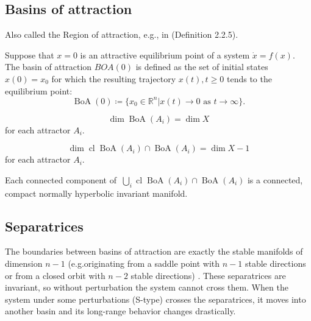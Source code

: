\documentclass{article}
\newcommand{\reals}{\mathbb{R}}
\newcommand{\cl}{\operatorname{cl}}
\newcommand{\boa}{\operatorname{BoA}}
\newcounter{ct}
\begin{document}

\subsection{Basins of attraction}\label{sec:boa}
 \citep{milnor1985attractor}
 \citep{hirsch1995computing}

Also called the Region of attraction, e.g., in  \citep{garces2012strategies} (Definition 2.2.5).
\begin{definition}
Suppose that $x=0$ is an attractive equilibrium point of a system $\dot x = f(x)$.
The basin of attraction $BOA(0)$ is defined as the set of initial states $x(0)=x_0$ for which the resulting trajectory $x(t), t\geq 0$ tends to the equilibrium point:
\begin{equation}
\boa(0) \coloneqq \{x_0\in \reals^n|x(t)\rightarrow0\text{ as } t\rightarrow\infty\}.
\end{equation}

\end{definition}


\begin{proposition}
\[\dim \boa(A_i) = \dim X\] for each attractor $A_i$.
\end{proposition}
\begin{proposition}
\[\dim\cl \boa(A_i) \cap \boa(A_i) = \dim X - 1 \] for each attractor $A_i$.
\end{proposition}



\begin{proposition}
Each connected component of $\ \bigcup_i\cl \boa(A_i) \cap \boa(A_i) $ is a connected, compact normally hyperbolic invariant manifold. %
\end{proposition}


\subsection{Separatrices}\label{sec:sep}
The boundaries between basins of attraction are exactly the stable manifolds of dimension $n-1$ (e.g.originating from a saddle point with $n-1$ stable directions 
or from a closed orbit with $n-2$ stable directions)  \citep{gruemm1975stable}.
These separatrices are invariant, so without  perturbation the system cannot cross them.
When the system under some perturbations (S-type) crosses the separatrices, it moves into another basin and its long-range behavior changes drastically.
\end{document}
